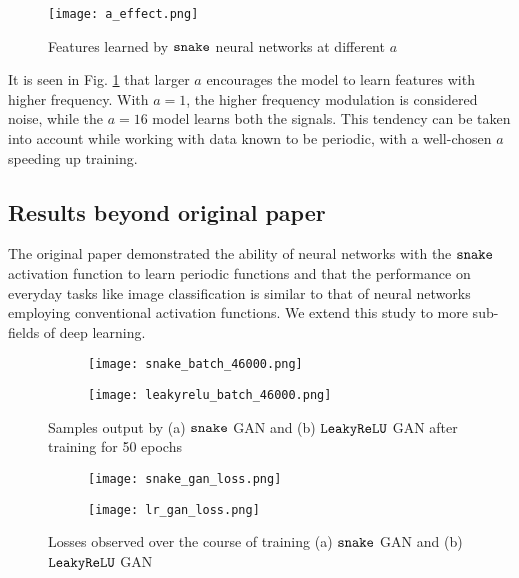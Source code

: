 \begin{figure}[h]
\centering
\texttt{[image: a\_effect.png]}
\caption{Features learned by $ \operatorname{\texttt{snake}} $ neural networks at different $a$}
\label{fig:a_effect}
\end{figure}

It is seen in Fig. \ref{fig:a_effect} that larger $a$ encourages the model to learn features with higher frequency. With $a = 1$, the higher frequency modulation is considered noise, while the $a = 16$ model learns both the signals. This tendency can be taken into account while working with data known to be periodic, with a well-chosen $a$ speeding up training.

\subsection{Results beyond original paper}
The original paper demonstrated the ability of neural networks with the $ \operatorname{\texttt{snake}} $ activation function to learn periodic functions and that the performance on everyday tasks like image classification is similar to that of neural networks employing conventional activation functions. We extend this study to more sub-fields of deep learning. \\

\begin{figure}[h]
  \centering
  \begin{subfigure}{0.35\textwidth}
  \centering
  \texttt{[image: snake\_batch\_46000.png]}
  \caption{}
  \label{fig:subim3}
  \end{subfigure}
  \begin{subfigure}{0.35\textwidth}
  \centering
  \texttt{[image: leakyrelu\_batch\_46000.png]}
  \caption{}
  \label{fig:subim4}
  \end{subfigure}

  \caption{Samples output by (a) $ \operatorname{\texttt{snake}} $ GAN and (b) $ \operatorname{\texttt{LeakyReLU}} $ GAN after training for 50 epochs}
  \label{fig:gan_outputs}
  \end{figure}

  \begin{figure}[h]
    \centering
    \begin{subfigure}{0.45\textwidth}
      \centering
      \texttt{[image: snake\_gan\_loss.png]}
      \caption{}
      \label{fig:subim5}
    \end{subfigure}
    \begin{subfigure}{0.45\textwidth}
      \centering
      \texttt{[image: lr\_gan\_loss.png]}
      \caption{}
      \label{fig:subim6}
    \end{subfigure}
    \caption{Losses observed over the course of training (a) $ \operatorname{\texttt{snake}} $ GAN and (b) $ \operatorname{\texttt{LeakyReLU}} $ GAN}
    \label{fig:gan_losses}
  \end{figure}

